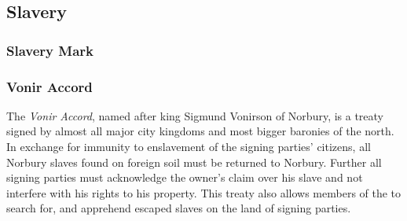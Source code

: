 \subsection{Slavery}
\label{sec:Slavery}


\subsubsection{Slavery Mark}
\label{sec:Slavery Mark}


\subsubsection{Vonir Accord}
\label{sec:Vonir Accord}

The \emph{Vonir Accord}, named after king Sigmund Vonirson of Norbury, is a
treaty signed by almost all major city kingdoms and most bigger baronies of
the north. In exchange for immunity to enslavement of the signing parties'
citizens, all Norbury slaves found on foreign soil must be returned to
Norbury. Further all signing parties must acknowledge the owner's claim over
his slave and not interfere with his rights to his property. This treaty
also allows members of the  to search for, and
apprehend escaped slaves on the land of signing parties.
